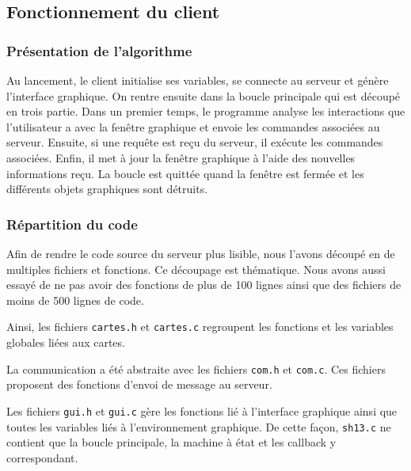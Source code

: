 \subsection{Fonctionnement du client}

\subsubsection{Présentation de l'algorithme}

Au lancement, le client initialise ses variables, se connecte au serveur et génère l'interface graphique. On rentre ensuite dans la boucle principale qui est découpé en trois partie. Dans un premier temps, le programme analyse les interactions que l'utilisateur a avec la fenêtre graphique et envoie les commandes associées au serveur. Ensuite, si une requête est reçu du serveur, il exécute les commandes associées. Enfin, il met à jour la fenêtre graphique à l'aide des nouvelles informations reçu. La boucle est quittée quand la fenêtre est fermée et les différents objets graphiques sont détruits.

\subsubsection{Répartition du code}

Afin de rendre le code source du serveur plus lisible, nous l'avons découpé en de multiples fichiers et fonctions. Ce découpage est thématique. Nous avons aussi essayé de ne pas avoir des fonctions de plus de 100 lignes ainsi que des fichiers de moins de 500 lignes de code.

Ainsi, les fichiers \verb=cartes.h= et \verb=cartes.c= regroupent les fonctions et les variables globales liées aux cartes.

La communication a été abstraite avec les fichiers \verb=com.h= et \verb=com.c=. Ces fichiers proposent des fonctions d'envoi de message au serveur.

Les fichiers \verb=gui.h= et \verb=gui.c= gère les fonctions lié à l'interface graphique ainsi que toutes les variables liés à l'environnement graphique. De cette façon, \verb=sh13.c= ne contient que la boucle principale, la machine à état et les callback y correspondant.